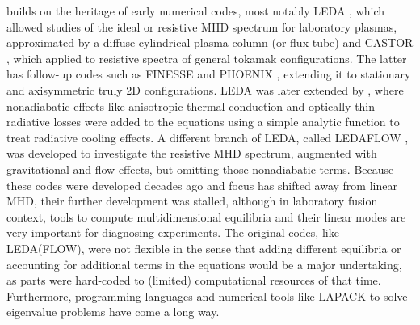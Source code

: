 {\legolas} builds on the heritage of early numerical codes, most notably LEDA \citep{kerner1985}, which allowed studies of the ideal or resistive MHD spectrum for laboratory plasmas, approximated by a diffuse cylindrical plasma column (or flux tube) and CASTOR \citep{kerner1998}, which applied to resistive spectra of general tokamak configurations. The latter has follow-up codes such as FINESSE \citep{belien2002} and PHOENIX \citep{blokland2007_phoenix}, extending it to stationary and axisymmetric truly 2D configurations. LEDA was later extended by \citet{vanderlinden1992}, where nonadiabatic effects like anisotropic thermal conduction and optically thin radiative losses were added to the equations using a simple analytic function to treat radiative cooling effects. A different branch of LEDA, called LEDAFLOW \citep{nijboer1997}, was developed to investigate the resistive MHD spectrum, augmented with gravitational and flow effects, but omitting those nonadiabatic terms. Because these codes were developed decades ago and focus has shifted away from linear MHD, their further development was stalled, although in laboratory fusion context, tools to compute multidimensional equilibria and their linear modes are very important for diagnosing experiments. The original codes, like LEDA(FLOW), were not flexible in the sense that adding different equilibria or accounting for additional terms in the equations would be a major undertaking, as parts were hard-coded to (limited) computational resources of that time. Furthermore, programming languages and numerical tools like LAPACK \citep{book_lapack} to solve eigenvalue problems have come a long way.

